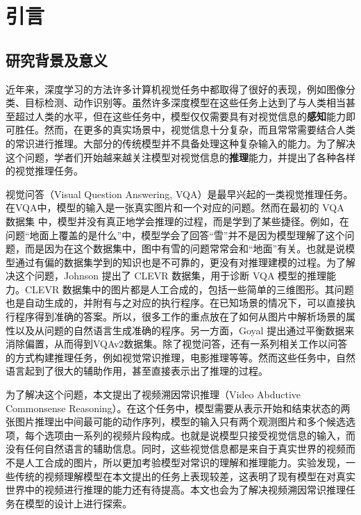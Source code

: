 
\chapter{引言}
\label{cha:intro}

\section{研究背景及意义}
近年来，深度学习的方法许多计算机视觉任务中都取得了很好的表现，例如图像分类\cite{he2016deep,krizhevsky2012imagenet}、目标检测\cite{ren2015faster}、动作识别\cite{wang2016temporal,tran2018closer,carreira2017quo}等。虽然许多深度模型在这些任务上达到了与人类相当甚至超过人类的水平，但在这些任务中，模型仅仅需要具有对视觉信息的\textbf{感知}能力即可胜任。然而，在更多的真实场景中，视觉信息十分复杂，而且常常需要结合人类的常识进行推理。大部分的传统模型并不具备处理这种复杂输入的能力。为了解决这个问题，学者们开始越来越关注模型对视觉信息的\textbf{推理}能力，并提出了各种各样的视觉推理任务。

视觉问答（Visual Question Answering, VQA）是最早兴起的一类视觉推理任务\cite{antol2015vqa}。在VQA中，模型的输入是一张真实图片和一个对应的问题。然而在最初的 VQA 数据集\cite{antol2015vqa} 中，模型并没有真正地学会推理的过程，而是学到了某些捷径\cite{johnson2017clevr}。例如，在问题“地面上覆盖的是什么”中，模型学会了回答“雪”并不是因为模型理解了这个问题，而是因为在这个数据集中，图中有雪的问题常常会和“地面”有关。也就是说模型通过有偏的数据集学到的知识也是不可靠的，更没有对推理建模的过程。为了解决这个问题，Johnson \etal \cite{johnson2017clevr} 提出了 CLEVR 数据集，用于诊断 VQA 模型的推理能力。CLEVR 数据集中的图片都是人工合成的，包括一些简单的三维图形。其问题也是自动生成的，并附有与之对应的执行程序。在已知场景的情况下，可以直接执行程序得到准确的答案。所以，很多工作的重点放在了如何从图片中解析场景的属性以及从问题的自然语言生成准确的程序\cite{Johnson_2017_ICCV,yi2018neural,vedantam2019probabilistic}。另一方面，Goyal \etal\cite{goyal2017making}提出通过平衡数据来消除偏置，从而得到VQAv2数据集。除了视觉问答，还有一系列相关工作以问答的方式构建推理任务，例如视觉常识推理\cite{zellers2019recognition}，电影推理\cite{tapaswi2016movieqa}等等。然而这些任务中，自然语言起到了很大的辅助作用，甚至直接表示出了推理的过程。

为了解决这个问题，本文提出了视频溯因常识推理（Video Abductive Commonsense Reasoning）。在这个任务中，模型需要从表示开始和结束状态的两张图片推理出中间最可能的动作序列，模型的输入只有两个观测图片和多个候选选项，每个选项由一系列的视频片段构成。也就是说模型只接受视觉信息的输入，而没有任何自然语言的辅助信息。同时，这些视觉信息都是来自于真实世界的视频而不是人工合成的图片，所以更加考验模型对常识的理解和推理能力。实验发现，一些传统的视频理解模型在本文提出的任务上表现较差，这表明了现有模型在对真实世界中的视频进行推理的能力还有待提高。本文也会为了解决视频溯因常识推理任务在模型的设计上进行探索。

